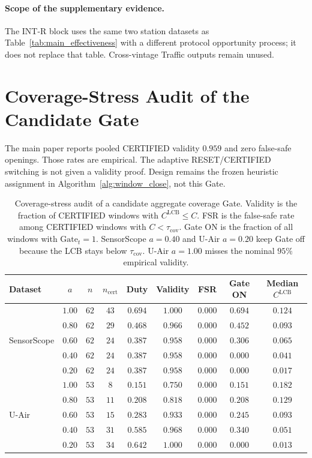 \paragraph{Scope of the supplementary evidence.}
The INT-R block uses the same two station datasets as
Table~\ref{tab:main_effectiveness} with a different protocol opportunity
process; it does not replace that table.  Cross-vintage Traffic
outputs remain unused.

\section{Coverage-Stress Audit of the Candidate Gate}
\label{app:certificate_audit}

The main paper reports pooled CERTIFIED validity $0.959$ and zero
false-safe openings.  Those rates are empirical.  The adaptive
RESET/CERTIFIED switching is not given a validity proof.
Design remains the frozen heuristic assignment in
Algorithm~\ref{alg:window_close}, not this Gate.

\begin{table}[t]
\centering
\caption{Coverage-stress audit of a candidate aggregate coverage Gate.
Validity is the fraction of CERTIFIED windows with
$C^{\mathrm{LCB}}\le C$.  FSR is the false-safe rate among CERTIFIED
windows with $C<\tau_{\mathrm{cov}}$.  Gate ON is the fraction of all
windows with $\mathrm{Gate}_t=1$.  SensorScope $a=0.40$ and U-Air
$a=0.20$ keep Gate off because the LCB stays below $\tau_{\mathrm{cov}}$.
U-Air $a=1.00$ misses the nominal $95\%$ empirical validity.}
\label{tab:certificate_stress}
\scriptsize
\setlength{\tabcolsep}{3.2pt}
\begin{tabular}{lcccccccc}
\toprule
Dataset & $a$ & $n$ & $n_{\mathrm{cert}}$ & Duty & Validity & FSR & Gate ON & Median $C^{\mathrm{LCB}}$\\
\midrule
\multirow{5}{*}{SensorScope}
& $1.00$ & $62$ & $43$ & $0.694$ & $1.000$ & $0.000$ & $0.694$ & $0.124$\\
& $0.80$ & $62$ & $29$ & $0.468$ & $0.966$ & $0.000$ & $0.452$ & $0.093$\\
& $0.60$ & $62$ & $24$ & $0.387$ & $0.958$ & $0.000$ & $0.306$ & $0.065$\\
& $0.40$ & $62$ & $24$ & $0.387$ & $0.958$ & $0.000$ & $0.000$ & $0.041$\\
& $0.20$ & $62$ & $24$ & $0.387$ & $0.958$ & $0.000$ & $0.000$ & $0.017$\\
\midrule
\multirow{5}{*}{U-Air}
& $1.00$ & $53$ & $8$ & $0.151$ & $0.750$ & $0.000$ & $0.151$ & $0.182$\\
& $0.80$ & $53$ & $11$ & $0.208$ & $0.818$ & $0.000$ & $0.208$ & $0.129$\\
& $0.60$ & $53$ & $15$ & $0.283$ & $0.933$ & $0.000$ & $0.245$ & $0.093$\\
& $0.40$ & $53$ & $31$ & $0.585$ & $0.968$ & $0.000$ & $0.340$ & $0.051$\\
& $0.20$ & $53$ & $34$ & $0.642$ & $1.000$ & $0.000$ & $0.000$ & $0.013$\\
\bottomrule
\end{tabular}
\end{table}

